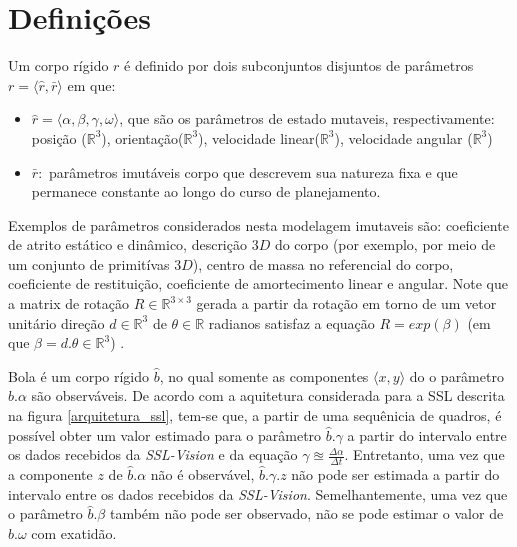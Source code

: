 \section{Definições}

\begin{defi}
  Um corpo rígido $r$ é definido por dois subconjuntos disjuntos
  de parâmetros $r= \langle \hat{r}, \bar{r} \rangle$ em que:
  \begin{itemize}
    \item $\hat{r} = \langle \alpha, \beta, \gamma, \omega \rangle$,
    que são os parâmetros de estado mutaveis, respectivamente:
    posição ($\mathbb{R} ^{3}$), orientação($\mathbb{R} ^{3}$),
    velocidade linear($\mathbb{R} ^{3}$), velocidade angular
    ($\mathbb{R} ^{3}$)

    \item $\bar{r} :$ parâmetros imutáveis corpo que descrevem sua
    natureza fixa e que permanece constante ao longo do curso de 
    planejamento.
  \end{itemize}

  Exemplos de parâmetros considerados nesta modelagem imutaveis são:
  coeficiente de atrito estático e dinâmico, descrição $3D$ do corpo
  (por exemplo, por meio de um conjunto de primitívas $3D$), centro de
  massa no referencial do corpo, coeficiente de restituição,
  coeficiente de amortecimento linear e angular. Note que a matrix de
  rotação $R\in\mathbb{R}^{3\times 3}$ gerada a partir da rotação
  em torno de um vetor unitário direção $d\in\mathbb{R}^{3}$  de
  $\theta \in \mathbb{R}$ radianos satisfaz a equação
  $R = exp\left( \beta \right)$ (em que $\beta = d. \theta \in \mathbb{R} ^{3}$)
  \cite{math2robotics}.
\end{defi}

\begin{defi}[Bola]\label{def:bola}
  Bola é um corpo rígido $\hat{b}$, no qual somente as componentes 
  $\langle x,y \rangle$ do o parâmetro $\hat{b}.\alpha$ são
  observáveis. De acordo com a
  aquitetura considerada para a SSL descrita na figura
  \ref{arquitetura_ssl}, tem-se que, a partir de uma sequênicia
  de quadros, é possível obter um valor estimado para o parâmetro
  $\hat{b}.\gamma$ a partir do intervalo entre os dados recebidos
  da \textit{SSL-Vision} e da equação $ \gamma \approxeq 
  \frac{\Delta \alpha}{\Delta t} $. Entretanto, uma vez que a componente
  $z$ de $\hat{b}.\alpha$ não é observável, $\hat{b}.\gamma.z$ 
  não pode ser estimada a partir do intervalo entre os dados recebidos
  da \textit{SSL-Vision}. Semelhantemente,  uma vez que o
  parâmetro $\hat{b}.\beta$ também não pode ser observado,
  não se pode estimar o valor de $\hat{b}.\omega$ com exatidão.
\end{defi}

